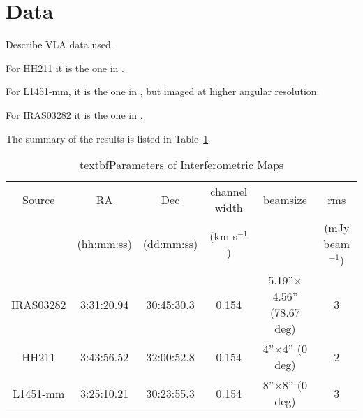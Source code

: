 \section{Data}

Describe VLA data used.

For HH211 it is the one in \cite{Tanner_2010}.

For L1451-mm, it is the one in \cite{Pineda_2011}, but imaged at higher angular resolution.

For IRAS03282 it is the one in \cite{Tobin_2011}. 

The summary of the results is listed in Table~\ref{table:obs}

\begin{table} 
\label{table:obs}
    \begin{tabular}{ c c c c c c }
        Source & RA & Dec & channel width & beamsize & rms \\ 
         & (hh:mm:ss) & (dd:mm:ss) & (km s$^{-1}$) &  & (mJy beam$^{-1}$) \\ 
        IRAS03282 & 3:31:20.94 & 30:45:30.3 & 0.154 & 5.19''$\times$4.56'' (78.67 deg) & 3 \\ 
        HH211 & 3:43:56.52 & 32:00:52.8 & 0.154 & 4''$\times$4'' (0 deg) & 2 \\ 
        L1451-mm & 3:25:10.21 & 30:23:55.3 & 0.154 & 8''$\times$8'' (0 deg) & 3 \\ 
    \end{tabular} 
    \caption {textbf{Parameters of Interferometric Maps}}
\end{table}
  
  
  
  
  
  
  
  
  
  
  
  
  
  
  
  
